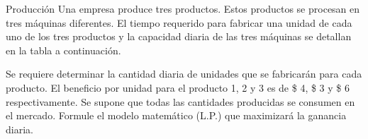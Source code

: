 \begin{frameExample}{Producción}{}
  Una empresa produce tres productos. Estos productos se procesan en tres máquinas diferentes. El tiempo requerido para fabricar una unidad de cada uno de los tres productos y la capacidad diaria de las tres máquinas se detallan en la tabla a continuación.

  {\centering
\par}

   Se requiere determinar la cantidad diaria de unidades que se fabricarán para cada producto. El beneficio por unidad para el producto 1, 2 y 3 es de \$ 4, \$ 3 y \$ 6 respectivamente. Se supone que todas las cantidades producidas se consumen en el mercado. Formule el modelo matemático (L.P.) que maximizará la ganancia diaria.
\end{frameExample}



